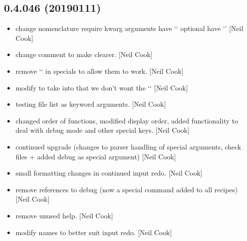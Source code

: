 \documentclass[a4paper,10pt,english]{report}
\begin{document}
\subsection{0.4.046 (2019\sphinxhyphen{}01\sphinxhyphen{}11)}
\label{\detokenize{misc/changelog:id238}}\begin{itemize}
\item {} 
 \sphinxhyphen{} change nomenclature require kwarg arguments have
‘\sphinxhyphen{}‘ optional have ‘\textendash{}’ {[}Neil Cook{]}

\item {} 
 \sphinxhyphen{} change comment to make clearer. {[}Neil Cook{]}

\item {} 
 \sphinxhyphen{} remove ‘\sphinxhyphen{}‘ in specials to allow them to work.
{[}Neil Cook{]}

\item {} 
 \sphinxhyphen{} modify  to take into that we don’t wont
the ‘\sphinxhyphen{}‘ {[}Neil Cook{]}

\item {} 
 \sphinxhyphen{} testing file list as keyword arguments. {[}Neil
Cook{]}

\item {} 
 \sphinxhyphen{} changed order of functions, modified display
order, added functionality to deal with debug mode and other special
keys. {[}Neil Cook{]}

\item {} 
 \sphinxhyphen{} continued upgrade (changes to parser handling of
special arguments, check files + added debug as special argument)
{[}Neil Cook{]}

\item {} 
 \sphinxhyphen{} small formatting changes in continued input redo.
{[}Neil Cook{]}

\item {} 
 \sphinxhyphen{} remove references to debug (now a special command
added to all recipes) {[}Neil Cook{]}

\item {} 
 \sphinxhyphen{} remove unused help. {[}Neil Cook{]}

\item {} 
 \sphinxhyphen{} modify names to better suit input redo. {[}Neil Cook{]}

\end{itemize}
\end{document}
